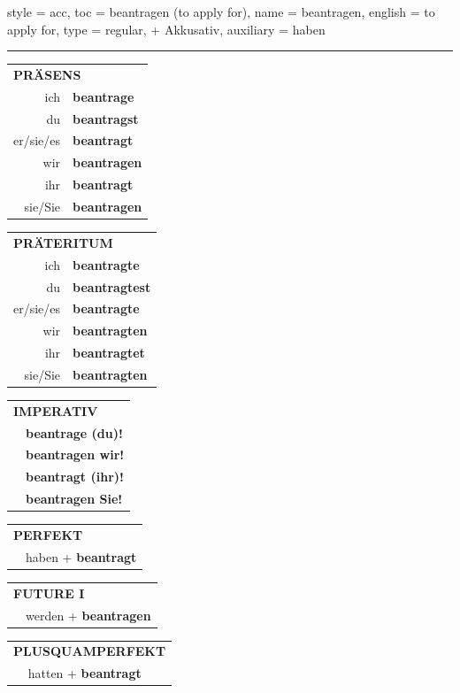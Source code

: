 \begin{verbentry}{
  style = {acc},
  toc = {beantragen (to apply for)},
  name = {beantragen},
  english = {to apply for},
  type = {regular, + Akkusativ},
  auxiliary = {haben}
}


\vspace{5pt}
\hrule
\vspace{5pt}

\begin{tabular}{rl}
\multicolumn{2}{l}{\textbf{PRÄSENS}}\\
ich & \textbf{beantrage}\\
du & \textbf{beantragst}\\
er/sie/es & \textbf{beantragt}\\
wir & \textbf{beantragen}\\
ihr & \textbf{beantragt}\\
sie/Sie & \textbf{beantragen}\\
\end{tabular}
\hfill
\begin{tabular}{rl}
\multicolumn{2}{l}{\textbf{PRÄTERITUM}}\\
ich & \textbf{beantragte}\\
du & \textbf{beantragtest}\\
er/sie/es & \textbf{beantragte}\\
wir & \textbf{beantragten}\\
ihr & \textbf{beantragtet}\\
sie/Sie & \textbf{beantragten}\\
\end{tabular}
\hfill
\begin{tabular}{rl}
\multicolumn{2}{l}{\textbf{IMPERATIV}}\\
& \textbf{beantrage (du)!}\\
& \textbf{beantragen wir!}\\
& \textbf{beantragt (ihr)!}\\
& \textbf{beantragen Sie!}\\
\end{tabular}

\vspace{10pt}

\begin{tabular}{rl}
\multicolumn{2}{l}{\textbf{PERFEKT}}\\
& haben + \textbf{beantragt}\\
\end{tabular}
\hfill
\begin{tabular}{rl}
\multicolumn{2}{l}{\textbf{FUTURE I}}\\
& werden + \textbf{beantragen}\\
\end{tabular}
\hfill
\begin{tabular}{rl}
\multicolumn{2}{l}{\textbf{PLUSQUAMPERFEKT}}\\
& hatten + \textbf{beantragt}\\
\end{tabular}


\end{verbentry}
